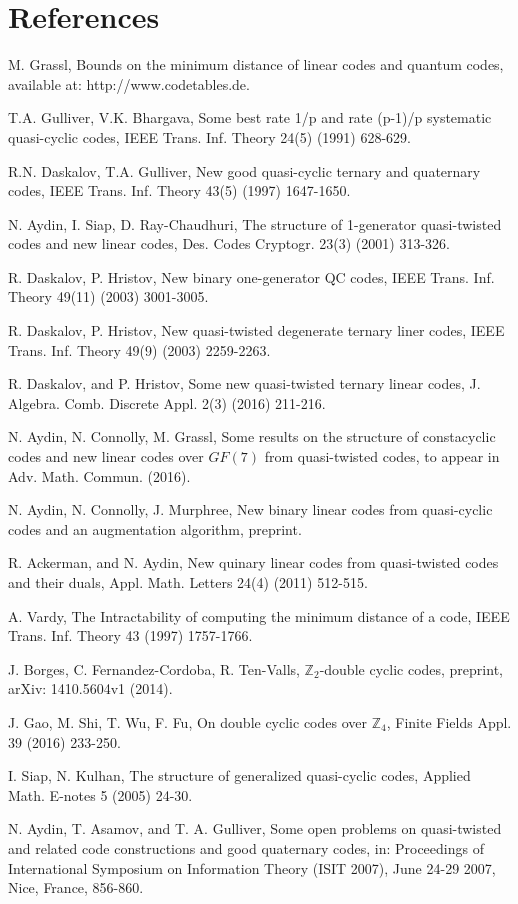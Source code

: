 \documentclass[preprint,12pt]{elsarticle}
\begin{document}
\section*{References}
\begin{thebibliography}{00}

 M. Grassl, Bounds on the minimum distance of linear codes and quantum codes, available at: http://www.codetables.de.

 T.A. Gulliver, V.K. Bhargava, Some best rate 1/p and rate (p-1)/p systematic quasi-cyclic codes, IEEE Trans. Inf. Theory 24(5) (1991) 628-629.

 R.N. Daskalov, T.A. Gulliver, New good quasi-cyclic ternary and quaternary codes, IEEE Trans. Inf. Theory 43(5) (1997) 1647-1650.

 N. Aydin, I. Siap, D. Ray-Chaudhuri, The structure of 1-generator quasi-twisted codes and new linear codes, Des. Codes Cryptogr. 23(3) (2001) 313-326.

 R. Daskalov, P. Hristov, New binary one-generator QC  codes,  IEEE Trans. Inf. Theory 49(11) (2003) 3001-3005.

 R. Daskalov, P. Hristov, New quasi-twisted degenerate ternary liner codes,  IEEE Trans. Inf. Theory 49(9) (2003) 2259-2263.

 R. Daskalov, and P. Hristov, Some new  quasi-twisted ternary linear codes, J. Algebra. Comb. Discrete Appl. 2(3) (2016) 211-216.

 N. Aydin,  N. Connolly, M. Grassl, Some results on the structure of constacyclic codes and new linear codes over $GF(7)$ from quasi-twisted codes, to appear in Adv. Math. Commun. (2016).

 N. Aydin, N. Connolly, J. Murphree, New binary linear codes from quasi-cyclic codes and an augmentation algorithm, preprint.

 R. Ackerman, and N. Aydin, New quinary linear codes from quasi-twisted codes and their duals, Appl. Math. Letters 24(4) (2011) 512-515.

 A. Vardy, The Intractability of computing the minimum distance of a code, IEEE Trans. Inf. Theory 43 (1997) 1757-1766.

 J. Borges, C. Fernandez-Cordoba, R. Ten-Valls, $\mathbb{Z}_2$-double cyclic codes, preprint, arXiv: 1410.5604v1 (2014).

 J. Gao, M. Shi, T. Wu, F. Fu, On double cyclic codes over  $\mathbb{Z}_4$, Finite Fields  Appl. 39 (2016) 233-250.

 I. Siap, N. Kulhan, The structure of generalized quasi-cyclic codes, Applied Math. E-notes 5 (2005) 24-30.  

 N. Aydin, T. Asamov, and T. A. Gulliver, Some open problems on quasi-twisted and related code constructions and good quaternary codes, in: Proceedings of International Symposium on Information Theory (ISIT 2007), June 24-29 2007, Nice, France, 856-860.

\end{thebibliography}
\end{document}
